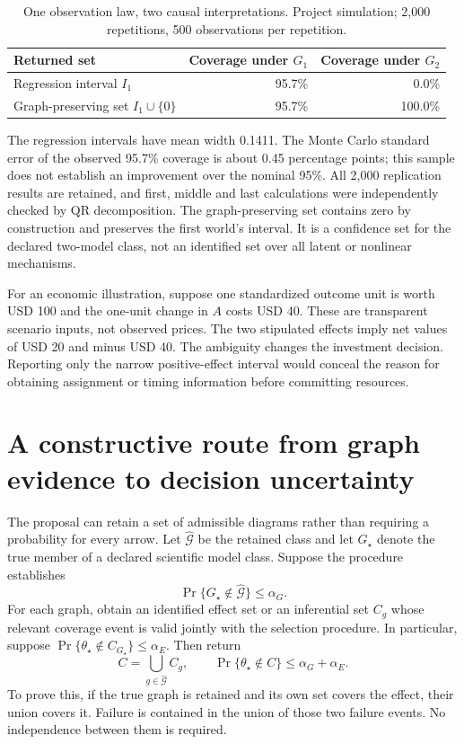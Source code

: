 \begin{table}[tbp]
\centering
\caption{One observation law, two causal interpretations. Project simulation;
 2,000 repetitions, 500 observations per repetition.}
\begin{tabular}{lrr}
\toprule
Returned set & Coverage under $G_1$ & Coverage under $G_2$\\
\midrule
Regression interval $I_1$ & 95.7\% & 0.0\%\\
Graph-preserving set $I_1\cup\{0\}$ & 95.7\% & 100.0\%\\
\bottomrule
\end{tabular}
\label{closure30:graph-coverage-table}
\end{table}

The regression intervals have mean width 0.1411. The Monte Carlo standard
error of the observed 95.7\% coverage is about 0.45 percentage points; this
sample does not establish an improvement over the nominal 95\%. All 2,000
replication results are retained, and first, middle and last calculations
were independently checked by QR decomposition. The graph-preserving set
contains zero by construction and preserves the first world's interval.
It is a confidence set for the declared two-model class, not an identified
set over all latent or nonlinear mechanisms.

For an economic illustration, suppose one standardized outcome unit is worth
USD 100 and the one-unit change in $A$ costs USD 40. These are
transparent scenario inputs, not observed prices. The two stipulated effects
imply net values of USD 20 and minus USD 40. The ambiguity changes
the investment decision. Reporting only the narrow positive-effect interval
would conceal the reason for obtaining assignment or timing information
before committing resources.

\section{A constructive route from graph evidence to decision uncertainty}

The proposal can retain a set of admissible diagrams rather than requiring a
probability for every arrow. Let $\widehat{\mathcal G}$ be the retained class
and let $G_\star$ denote the true member of a declared scientific model class.
Suppose the procedure establishes
\begin{equation}
 \Pr\{G_\star\notin\widehat{\mathcal G}\}\leq\alpha_G.
 \label{closure30:graph-retention-contract}
\end{equation}
For each graph, obtain an identified effect set or an inferential set
$C_g$ whose relevant coverage event is valid jointly with the selection
procedure. In particular, suppose
$\Pr\{\theta_\star\notin C_{G_\star}\}\leq\alpha_E$.
Then return
\begin{equation}
 C=\bigcup_{g\in\widehat{\mathcal G}} C_g,
 \qquad
 \Pr\{\theta_\star\notin C\}\leq\alpha_G+\alpha_E.
 \label{closure30:union-coverage}
\end{equation}
To prove this, if the true graph is retained and its own set covers the
effect, their union covers it. Failure is contained in the union of those
two failure events. No independence between them is required.

